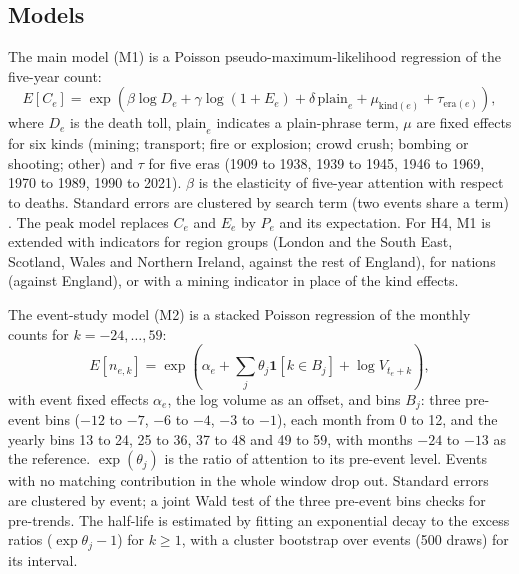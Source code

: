 \documentclass[11pt,a4paper]{article}
\begin{document}
\subsection{Models}
The main model (M1) is a Poisson pseudo-maximum-likelihood regression \citep{SantosSilvaTenreyro2006} of the five-year count:
\begin{equation}
E[C_e] = \exp\left(\beta \log D_e + \gamma \log(1 + E_e) + \delta\,\mathrm{plain}_e + \mu_{\mathrm{kind}(e)} + \tau_{\mathrm{era}(e)}\right),
\end{equation}
where $D_e$ is the death toll, $\mathrm{plain}_e$ indicates a plain-phrase term, $\mu$ are fixed effects for six kinds (mining; transport; fire or explosion; crowd crush; bombing or shooting; other) and $\tau$ for five eras (1909 to 1938, 1939 to 1945, 1946 to 1969, 1970 to 1989, 1990 to 2021). $\beta$ is the elasticity of five-year attention with respect to deaths. Standard errors are clustered by search term (two events share a term) \citep{CameronMiller2015}. The peak model replaces $C_e$ and $E_e$ by $P_e$ and its expectation. For H4, M1 is extended with indicators for region groups (London and the South East, Scotland, Wales and Northern Ireland, against the rest of England), for nations (against England), or with a mining indicator in place of the kind effects.

The event-study model (M2) is a stacked Poisson regression of the monthly counts for $k = -24, \dots, 59$:
\begin{equation}
E[n_{e,k}] = \exp\left(\alpha_e + \textstyle\sum_{j} \theta_j \mathbf{1}[k \in B_j] + \log V_{t_e + k}\right),
\end{equation}
with event fixed effects $\alpha_e$, the log volume as an offset, and bins $B_j$: three pre-event bins ($-12$ to $-7$, $-6$ to $-4$, $-3$ to $-1$), each month from 0 to 12, and the yearly bins 13 to 24, 25 to 36, 37 to 48 and 49 to 59, with months $-24$ to $-13$ as the reference. $\exp(\theta_j)$ is the ratio of attention to its pre-event level. Events with no matching contribution in the whole window drop out. Standard errors are clustered by event; a joint Wald test of the three pre-event bins checks for pre-trends. The half-life is estimated by fitting an exponential decay to the excess ratios ($\exp\theta_j - 1$) for $k \geq 1$, with a cluster bootstrap over events (500 draws) for its interval.
\end{document}
